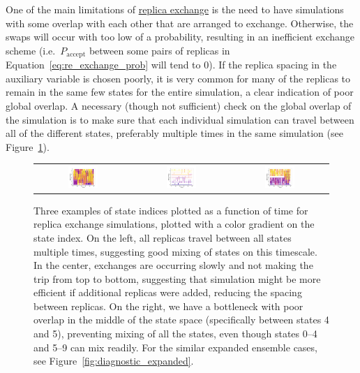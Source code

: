 \documentclass[9pt,review]{livecoms}
\begin{document}
One of the main limitations of \hyperlink{ref:ReplEx} {replica exchange} is the need to have simulations with some overlap with each other that are arranged to exchange. Otherwise, the swaps will occur with too low of a probability, resulting in an inefficient exchange scheme (i.e.~$P_\mathrm{accept}$ between some pairs of replicas in Equation~\ref{eq:re_exchange_prob} will tend to $0$). If the replica spacing in the auxiliary variable is chosen poorly, it is very common for many of the replicas to remain in the same few states for the entire simulation, a clear indication of poor global overlap. A necessary (though not sufficient) check on the global overlap of the simulation is to make sure that each individual simulation can travel between all of the different states, preferably multiple times in the same simulation (see Figure~\ref{fig:diagnostic_replica}).

\begin{figure}[!ht]
    \centering
\begin{tabular}{c|c|c}
\includegraphics[width=0.33\textwidth]{Figures/diagnostic_figures/goodmixing.png} & \includegraphics[width=0.33\textwidth]{Figures/diagnostic_figures/slowmixing.png}&
\includegraphics[width=0.33\textwidth]{Figures/diagnostic_figures/sepmixing.png}
\end{tabular}
    \caption{Three examples of state indices plotted as a function of time for replica exchange simulations, plotted with a color gradient on the state index.  On the left, all replicas travel between all states multiple times, suggesting good mixing of states on this timescale.  In the center, exchanges are occurring slowly and not making the trip from top to bottom, suggesting that simulation might be more efficient if additional replicas were added, reducing the spacing between replicas. On the right, we have a bottleneck with poor overlap in the middle of the state space (specifically between states 4 and 5), preventing mixing of all the states, even though states 0--4 and 5--9 can mix readily. For the similar expanded ensemble cases, see Figure~\ref{fig:diagnostic_expanded}.}
    \label{fig:diagnostic_replica}
\end{figure}
\end{document}
